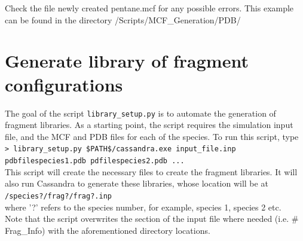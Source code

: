 Check the file newly created pentane.mcf for any possible errors. This example can be found in the directory 
/Scripts/MCF\_Generation/PDB/

\section{Generate library of fragment configurations}
\label{utility:libgen}

The goal of the script \texttt{library\_setup.py} is to automate the generation of fragment libraries.
As a starting point, the script requires the simulation input file, and the MCF and PDB 
files for each of the species. To run this script, type \\

\texttt{> library\_setup.py \$PATH\$/cassandra.exe input\_file.inp pdbfilespecies1.pdb pdfilespecies2.pdb ...} \\

This script will create the necessary files to create the fragment libraries. It will also run Cassandra 
to generate these libraries, whose location will be at \\

\texttt{/species?/frag?/frag?.inp} \\

where '?' refers to the species number, for example, species 1, species 2 etc. \\

Note that the script overwrites the section of the input file where 
needed (i.e. \# Frag\_Info) with the aforementioned directory locations.
